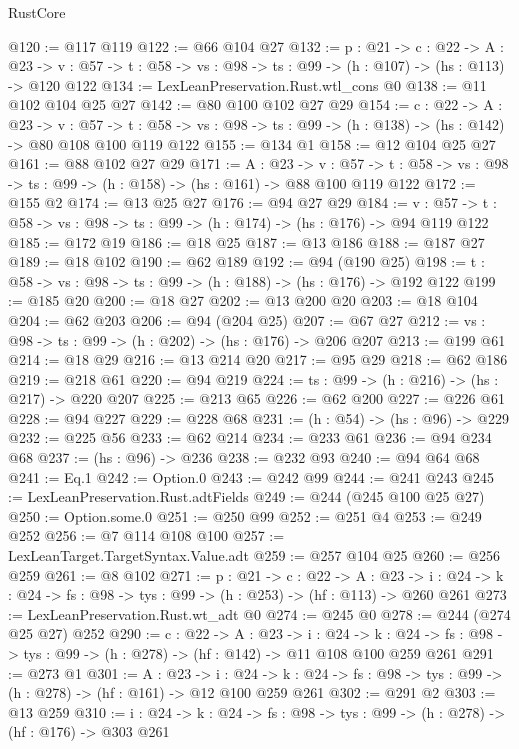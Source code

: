 \begin{lexlean}{RustCore}
\begin{coremodule}
{\begin{coremodule}
{@120 := @117 @119
@122 := @66 @104 @27
@132 := {p : @21} ->
  {c : @22} ->
  {A : @23} ->
  {v : @57} -> {t : @58} -> {vs : @98} -> {ts : @99} -> (h : @107) -> (hs : @113) -> @120 @122
@134 := LexLeanPreservation.Rust.wtl_cons @0
@138 := @11 @102 @104 @25 @27
@142 := @80 @100 @102 @27 @29
@154 := {c : @22} ->
  {A : @23} ->
  {v : @57} ->
  {t : @58} -> {vs : @98} -> {ts : @99} -> (h : @138) -> (hs : @142) -> @80 @108 @100 @119 @122
@155 := @134 @1
@158 := @12 @104 @25 @27
@161 := @88 @102 @27 @29
@171 := {A : @23} ->
  {v : @57} ->
  {t : @58} -> {vs : @98} -> {ts : @99} -> (h : @158) -> (hs : @161) -> @88 @100 @119 @122
@172 := @155 @2
@174 := @13 @25 @27
@176 := @94 @27 @29
@184 := {v : @57} ->
  {t : @58} -> {vs : @98} -> {ts : @99} -> (h : @174) -> (hs : @176) -> @94 @119 @122
@185 := @172 @19
@186 := @18 @25
@187 := @13 @186
@188 := @187 @27
@189 := @18 @102
@190 := @62 @189
@192 := @94 (@190 @25)
@198 := {t : @58} -> {vs : @98} -> {ts : @99} -> (h : @188) -> (hs : @176) -> @192 @122
@199 := @185 @20
@200 := @18 @27
@202 := @13 @200 @20
@203 := @18 @104
@204 := @62 @203
@206 := @94 (@204 @25)
@207 := @67 @27
@212 := {vs : @98} -> {ts : @99} -> (h : @202) -> (hs : @176) -> @206 @207
@213 := @199 @61
@214 := @18 @29
@216 := @13 @214 @20
@217 := @95 @29
@218 := @62 @186
@219 := @218 @61
@220 := @94 @219
@224 := {ts : @99} -> (h : @216) -> (hs : @217) -> @220 @207
@225 := @213 @65
@226 := @62 @200
@227 := @226 @61
@228 := @94 @227
@229 := @228 @68
@231 := (h : @54) -> (hs : @96) -> @229
@232 := @225 @56
@233 := @62 @214
@234 := @233 @61
@236 := @94 @234 @68
@237 := (hs : @96) -> @236
@238 := @232 @93
@240 := @94 @64 @68
@241 := Eq.{1}
@242 := Option.{0}
@243 := @242 @99
@244 := @241 @243
@245 := LexLeanPreservation.Rust.adtFields
@249 := @244 (@245 @100 @25 @27)
@250 := Option.some.{0}
@251 := @250 @99
@252 := @251 @4
@253 := @249 @252
@256 := @7 @114 @108 @100
@257 := LexLeanTarget.TargetSyntax.Value.adt
@259 := @257 @104 @25
@260 := @256 @259
@261 := @8 @102
@271 := {p : @21} ->
  {c : @22} ->
  {A : @23} ->
  {i : @24} -> {k : @24} -> {fs : @98} -> {tys : @99} -> (h : @253) -> (hf : @113) -> @260 @261
@273 := LexLeanPreservation.Rust.wt_adt @0
@274 := @245 @0
@278 := @244 (@274 @25 @27) @252
@290 := {c : @22} ->
  {A : @23} ->
  {i : @24} ->
  {k : @24} -> {fs : @98} -> {tys : @99} -> (h : @278) -> (hf : @142) -> @11 @108 @100 @259 @261
@291 := @273 @1
@301 := {A : @23} ->
  {i : @24} ->
  {k : @24} -> {fs : @98} -> {tys : @99} -> (h : @278) -> (hf : @161) -> @12 @100 @259 @261
@302 := @291 @2
@303 := @13 @259
@310 := {i : @24} ->
  {k : @24} -> {fs : @98} -> {tys : @99} -> (h : @278) -> (hf : @176) -> @303 @261
}
\end{coremodule}}
\end{coremodule}
\end{lexlean}
